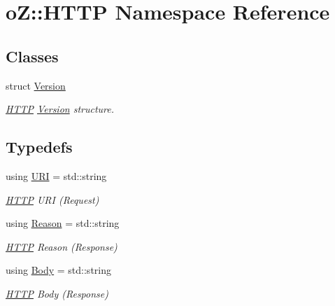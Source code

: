 \hypertarget{namespaceo_z_1_1_h_t_t_p}{}\section{oZ\+::H\+T\+TP Namespace Reference}
\label{namespaceo_z_1_1_h_t_t_p}
\subsection*{Classes}
\begin{DoxyCompactItemize}
\item 
struct \mbox{\hyperlink{structo_z_1_1_h_t_t_p_1_1_version}{Version}}
\begin{DoxyCompactList}\small\item\em \mbox{\hyperlink{namespaceo_z_1_1_h_t_t_p}{H\+T\+TP}} \mbox{\hyperlink{structo_z_1_1_h_t_t_p_1_1_version}{Version}} structure. \end{DoxyCompactList}\end{DoxyCompactItemize}
\subsection*{Typedefs}
\begin{DoxyCompactItemize}
\item 
using \mbox{\hyperlink{namespaceo_z_1_1_h_t_t_p_a6d47156e2eac27750983fc1b54bd2ff8}{U\+RI}} = std\+::string
\begin{DoxyCompactList}\small\item\em \mbox{\hyperlink{namespaceo_z_1_1_h_t_t_p}{H\+T\+TP}} U\+RI (Request) \end{DoxyCompactList}\item 
using \mbox{\hyperlink{namespaceo_z_1_1_h_t_t_p_afcd8b91e5e8a7b6df0a7b3b298ec3965}{Reason}} = std\+::string
\begin{DoxyCompactList}\small\item\em \mbox{\hyperlink{namespaceo_z_1_1_h_t_t_p}{H\+T\+TP}} Reason (Response) \end{DoxyCompactList}\item 
using \mbox{\hyperlink{namespaceo_z_1_1_h_t_t_p_a270c38b9f9b6228ce430fda6d5b150d6}{Body}} = std\+::string
\begin{DoxyCompactList}\small\item\em \mbox{\hyperlink{namespaceo_z_1_1_h_t_t_p}{H\+T\+TP}} Body (Response) \end{DoxyCompactList}\end{DoxyCompactItemize}
